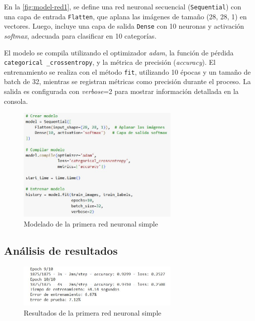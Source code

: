En la \autoref{fig:model-red1}, se define una red neuronal secuencial (\texttt{Sequential}) con una capa de entrada \texttt{Flatten}, que aplana las imágenes de tamaño (28, 28, 1) en vectores. Luego, incluye una capa de salida \texttt{Dense} con 10 neuronas y activación \textit{softmax}, adecuada para clasificar en 10 categorías.

El modelo se compila utilizando el optimizador \textit{adam}, la función de pérdida \texttt{categorical \_crossentropy}, y la métrica de precisión (\textit{accuracy}). El entrenamiento se realiza con el método \texttt{fit}, utilizando 10 épocas y un tamaño de batch de 32, mientras se registran métricas como precisión durante el proceso. La salida es configurada con \textit{verbose}=2 para mostrar información detallada en la consola.

\begin{figure}[H]
	\centering
	\includegraphics[width=0.7\textwidth]{imgs/model-red1.JPG}
	\caption{Modelado de la primera red neuronal simple}
	\label{fig:model-red1}
\end{figure}

\subsection{Análisis de resultados}

\begin{figure}[H]
	\centering
	\includegraphics[width=0.7\textwidth]{imgs/results-red1.JPG}
	\caption{Resultados de la primera red neuronal simple}
	\label{fig:results-red1}
\end{figure}

